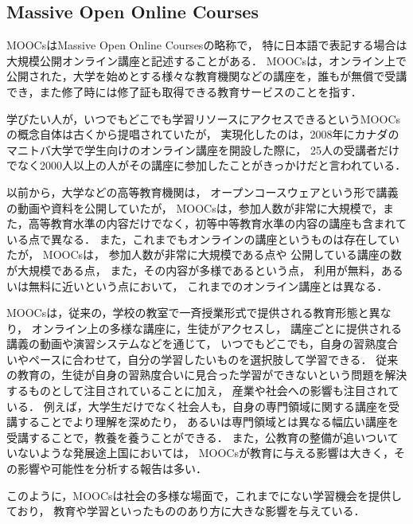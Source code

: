\subsection{Massive Open Online Courses}
MOOCsはMassive Open Online Courses\cite{mcauley2010mooc, pappano2012year,siemens2013massive}の略称で，
特に日本語で表記する場合は大規模公開オンライン講座と記述することがある．
MOOCsは，オンライン上で公開された，大学を始めとする様々な教育機関などの講座を，誰もが無償で受講でき，また修了時には修了証も取得できる教育サービスのことを指す．

学びたい人が，いつでもどこでも学習リソースにアクセスできるというMOOCsの概念自体は古くから提唱されていたが，
実現化したのは，2008年にカナダのマニトバ大学で学生向けのオンライン講座を開設した際に，
25人の受講者だけでなく2000人以上の人がその講座に参加したことがきっかけだと言われている\cite{yuan2013moocs}．


以前から，大学などの高等教育機関は，
オープンコースウェア\cite{abelson2008creation}という形で講義の動画や資料を公開していたが，
MOOCsは，参加人数が非常に大規模で，また，高等教育水準の内容だけでなく，初等中等教育水準の内容の講座も含まれている点で異なる．
また，これまでもオンラインの講座というものは存在していたが，
MOOCsは，
参加人数が非常に大規模である点や
公開している講座の数が大規模である点，
また，その内容が多様であるという点，
利用が無料，あるいは無料に近いという点において，
これまでのオンライン講座とは異なる．


MOOCsは，従来の，学校の教室で一斉授業形式で提供される教育形態と異なり，
オンライン上の多様な講座に，生徒がアクセスし，
講座ごとに提供される講義の動画や演習システムなどを通じて，
いつでもどこでも，自身の習熟度合いやペースに合わせて，自分の学習したいものを選択肢して学習できる．
従来の教育の，生徒が自身の習熟度合いに見合った学習ができないという問題を解決するものとして注目されていることに加え，
産業や社会への影響も注目されている．
例えば，大学生だけでなく社会人も，自身の専門領域に関する講座を受講することでより理解を深めたり，
あるいは専門領域とは異なる幅広い講座を受講することで，教養を養うことができる．
また，公教育の整備が追いついていないような発展途上国においては，
MOOCsが教育に与える影響は大きく，その影響や可能性を分析する報告は多い\cite{trucano2013more,liyanagunawardena2013impact}．

このように，MOOCsは社会の多様な場面で，これまでにない学習機会を提供しており，
教育や学習といったもののあり方に大きな影響を与えている．


